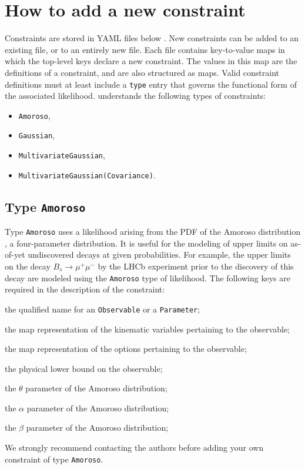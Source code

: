 \section{How to add a new constraint}

Constraints are stored in YAML files below . New constraints can be
added to an existing file, or to an entirely new file. Each file contains key-to-value maps
in which the top-level keys declare a new constraint.
The values in this map are the definitions of a constraint, and are also structured as maps. Valid
constraint definitions must at least include a \texttt{type} entry that governs the functional
form of the associated likelihood. \EOS understands the following types of constraints:
\begin{itemize}[labelwidth=.15\textwidth]
    \item \texttt{Amoroso},
    \item \texttt{Gaussian},
    \item \texttt{MultivariateGaussian},
    \item \texttt{MultivariateGaussian(Covariance)}.
\end{itemize}

\subsection{Type \texttt{Amoroso}}

Type \texttt{Amoroso} uses a likelihood arising from the \gls{PDF} of the
Amoroso distribution \cite{Crooks:2010}, a four-parameter distribution. It is
useful for the modeling of upper limits on as-of-yet undiscovered decays at
given probabilities. For example, the upper limits on the decay $B_s \to
\mu^+\mu^-$ by the LHCb experiment prior to the discovery of this decay are
modeled using the \texttt{Amoroso} type of likelihood. The following keys are
required in the description of the constraint:
\begin{description}[labelwidth=.15\textwidth]
    \item[\texttt{observable}] the qualified name for an \texttt{Observable} or a \texttt{Parameter};
    \item[\texttt{kinematics}] the map representation of the kinematic variables pertaining to the observable;
    \item[\texttt{options}] the map representation of the options pertaining to the observable;
    \item[\texttt{physical-limit}] the physical lower bound on the observable;
    \item[\texttt{theta}] the $\theta$ parameter of the Amoroso distribution;
    \item[\texttt{alpha}] the $\alpha$ parameter of the Amoroso distribution;
    \item[\texttt{beta}] the $\beta$ parameter of the Amoroso distribution;
\end{description}
We strongly recommend contacting the \EOS authors before adding your own constraint of type \texttt{Amoroso}.

